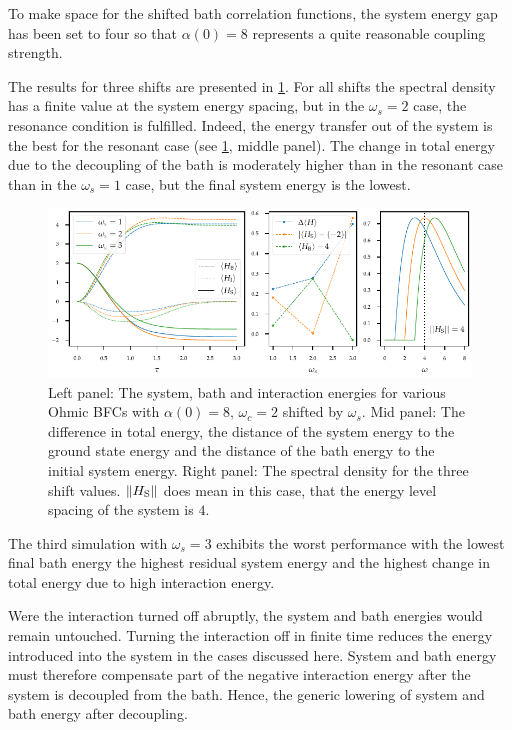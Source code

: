 To make space for the shifted bath correlation functions, the system
energy gap has been set to four so that \(α(0)=8\) represents a quite
reasonable coupling strength.

The results for three shifts are presented in
\cref{fig:resonance_analysis}. For all shifts the spectral density has
a finite value at the system energy spacing, but in the \(ω_s=2\)
case, the resonance condition is fulfilled. Indeed, the energy
transfer out of the system is the best for the resonant case (see
\cref{fig:resonance_analysis}, middle panel). The change in total
energy due to the decoupling of the bath is moderately higher than in
the resonant case than in the \(ω_s=1\) case, but the final system
energy is the lowest. 
\begin{figure}[ht]
  \centering
  \includegraphics{figs/one_bath_syst/resonance_analysis}
  \caption{\label{fig:resonance_analysis} Left
    panel: The system, bath and interaction energies for various Ohmic
    BFCs with \(α(0)=8,\,ω_c=2\) shifted by \(ω_s\). Mid panel: The
    difference in total energy, the distance of the system energy to
    the ground state energy and the distance of the bath energy to the
    initial system energy. Right panel: The spectral density for the
    three shift values. \(\norm{H_{\mathrm{S}}}\) does mean in this case, that
    the energy level spacing of the system is \(4\).}
\end{figure}

The third simulation with \(ω_s=3\) exhibits the worst performance
with the lowest final bath energy the highest residual system energy
and the highest change in total energy due to high interaction
energy.

Were the interaction turned off abruptly, the system and bath energies
would remain untouched. Turning the interaction off in finite time
reduces the energy introduced into the system in the cases discussed
here. System and bath energy must therefore compensate part of the
negative interaction energy after the system is decoupled from the
bath. Hence, the generic lowering of system and bath energy after
decoupling.

